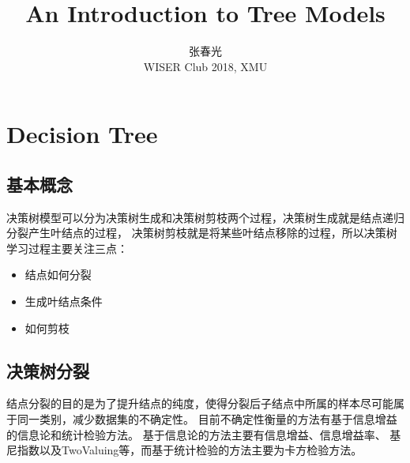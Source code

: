 \documentclass[a4paper]{article}
\title{An Introduction to Tree Models}
\author{张春光\\WISER Club 2018, XMU}
\begin{document}
\setlength{\parindent}{2em}
\maketitle{}
\tableofcontents
\section{Decision Tree}
	\subsection{基本概念}
	决策树模型可以分为决策树生成和决策树剪枝两个过程，决策树生成就是结点递归分裂产生叶结点的过程，
	决策树剪枝就是将某些叶结点移除的过程，所以决策树学习过程主要关注三点：
		\begin{itemize}
			\item 	结点如何分裂
			\item 	生成叶结点条件
			\item 	如何剪枝
		\end{itemize}
	\subsection{决策树分裂}
	结点分裂的目的是为了提升结点的纯度，使得分裂后子结点中所属的样本尽可能属于同一类别，减少数据集的不确定性。 
	目前不确定性衡量的方法有基于信息增益的信息论和统计检验方法。 基于信息论的方法主要有信息增益、信息增益率、
	基尼指数以及TwoValuing等，而基于统计检验的方法主要为卡方检验方法。
\end{document}
